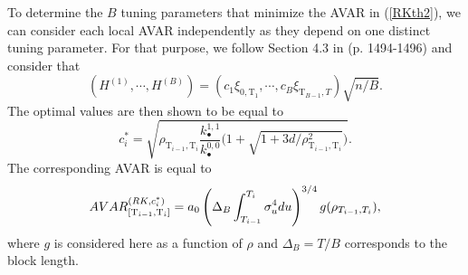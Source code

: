 \documentclass[11pt]{article}
\numberwithin{equation}{section}
\newcommand{\Tau}{\mathrm{T}}
\theoremstyle{plain}
\theoremstyle{remark}
\begin{document}
To determine the $B$ tuning parameters that minimize the AVAR in (\ref{RKth2}), we can consider each local AVAR independently as they depend on one distinct tuning parameter. For that purpose, we follow Section 4.3 in \cite{barndorff2008designing} (p. 1494-1496) and consider that 
$$(H^{(1)}, \cdots, H^{(B)}) = (c_1 \xi_{0, \Tau_{1}}, \cdots, c_B \xi_{\Tau_{B-1}, T}) \sqrt{n/B}.$$ 
The optimal values are then shown to be equal to 
$$c_i^* = \sqrt{\rho_{\Tau_{i-1}, \Tau_i}  \frac{k_{\bullet}^{1,1}}{k_{\bullet}^{0,0}} \bigg( 1 + \sqrt{1 + 3 d / \rho_{\Tau_{i-1}, \Tau_i}^2} \bigg)}.$$
The corresponding AVAR is equal to 
$$AVAR_{[\Tau_{i-1}, \Tau_i]}^{(RK,c_i^*)} =  a_0 \l( \Delta_B \int_{T_{i-1}}^{T_i} \sigma_u^4 du \r)^{3/4} g (\rho_{T_{i-1},T_i}),$$
where $g$ is considered here as a function of $\rho$ and $\Delta_B = T/B$ corresponds to the block length. 
\end{document}
